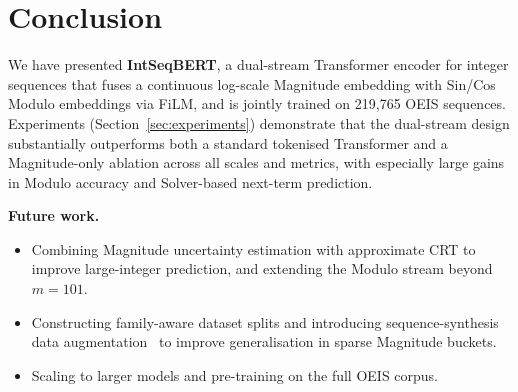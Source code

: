 
\section{Conclusion}
\label{sec:conclusion}

We have presented \textbf{IntSeqBERT}, a dual-stream Transformer encoder for integer sequences
that fuses a continuous log-scale Magnitude embedding with Sin/Cos Modulo embeddings via FiLM,
and is jointly trained on 219,765 OEIS sequences. Experiments (Section~\ref{sec:experiments})
demonstrate that the dual-stream design substantially outperforms both a standard tokenised
Transformer and a Magnitude-only ablation across all scales and metrics, with especially large
gains in Modulo accuracy and Solver-based next-term prediction.

\textbf{Future work.}
\begin{itemize}
  \item Combining Magnitude uncertainty estimation with approximate CRT to improve large-integer
        prediction, and extending the Modulo stream beyond $m = 101$.
  \item Constructing family-aware dataset splits and introducing sequence-synthesis data
        augmentation~\cite{zurich-fact} to improve generalisation in sparse Magnitude buckets.
  \item Scaling to larger models and pre-training on the full OEIS corpus.
\end{itemize}
